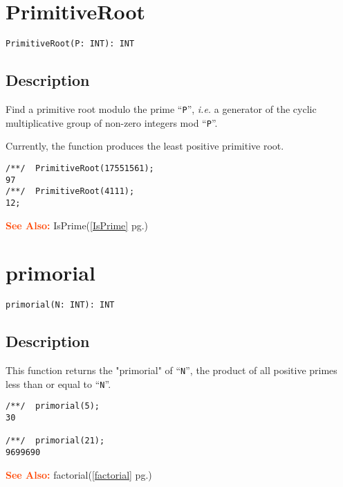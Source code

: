 \documentclass[a4paper]{mybook}
\newenvironment{command}{}{} %
\newcommand\SeeAlso{\par\textcolor{OrangeRed}{\textbf{\large See Also: }}}
\begin{document}
\section{PrimitiveRoot}
\label{PrimitiveRoot}
\begin{command} %


\begin{Verbatim}[label=syntax, rulecolor=\color{MidnightBlue},
frame=single]
PrimitiveRoot(P: INT): INT
\end{Verbatim}


\subsection*{Description}

Find a primitive root modulo the prime ``\verb&P&'', \textit{i.e.} a generator of
the cyclic multiplicative group of non-zero integers mod ``\verb&P&''.
\par 
Currently, the function produces the least positive primitive root.
\begin{Verbatim}[label=example, rulecolor=\color{PineGreen}, frame=single]
/**/  PrimitiveRoot(17551561);
97
/**/  PrimitiveRoot(4111);
12;
\end{Verbatim}


\SeeAlso %
  IsPrime(\ref{IsPrime} pg.\pageref{IsPrime})
\end{command} %

\section{primorial}
\label{primorial}
\begin{command} %


\begin{Verbatim}[label=syntax, rulecolor=\color{MidnightBlue},
frame=single]
primorial(N: INT): INT
    \end{Verbatim}


\subsection*{Description}

This function returns the "primorial" of ``\verb&N&'', the product of all
positive primes less than or equal to ``\verb&N&''.
\begin{Verbatim}[label=example, rulecolor=\color{PineGreen}, frame=single]
/**/  primorial(5);
30

/**/  primorial(21);
9699690
\end{Verbatim}


\SeeAlso %
  factorial(\ref{factorial} pg.\pageref{factorial})
\end{command} %
\end{document}
